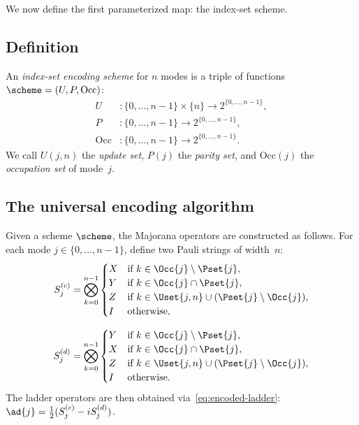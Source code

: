 
We now define the first parameterized map: the index-set scheme.

\subsection{Definition}

\begin{definition}
\label{def:index-set-scheme}
An \emph{index-set encoding scheme} for $n$ modes is a triple of
functions $\scheme = (U, P, \mathrm{Occ})$:
\begin{align}
  U &: \{0, \ldots, n{-}1\} \times \{n\} \to 2^{\{0,\ldots,n{-}1\}},
    \label{eq:update-fn} \\
  P &: \{0, \ldots, n{-}1\} \to 2^{\{0,\ldots,n{-}1\}},
    \label{eq:parity-fn} \\
  \mathrm{Occ} &: \{0, \ldots, n{-}1\} \to 2^{\{0,\ldots,n{-}1\}}.
    \label{eq:occ-fn}
\end{align}
We call $U(j,n)$ the \emph{update set}, $P(j)$ the \emph{parity set},
and $\mathrm{Occ}(j)$ the \emph{occupation set} of mode~$j$.
\end{definition}

\subsection{The universal encoding algorithm}
\label{sec:universal-algorithm}

Given a scheme $\scheme$, the Majorana operators are constructed as
follows.  For each mode $j \in \{0, \ldots, n{-}1\}$, define two
Pauli strings of width~$n$:
\begin{align}
  S_j^{(c)} &= \bigotimes_{k=0}^{n-1}
    \begin{cases}
      X & \text{if } k \in \Occ{j} \setminus \Pset{j}, \\
      Y & \text{if } k \in \Occ{j} \cap \Pset{j}, \\
      Z & \text{if } k \in \Uset{j,n} \cup
          (\Pset{j} \setminus \Occ{j}), \\
      I & \text{otherwise},
    \end{cases}
    \label{eq:cj-from-scheme} \\[6pt]
  S_j^{(d)} &= \bigotimes_{k=0}^{n-1}
    \begin{cases}
      Y & \text{if } k \in \Occ{j} \setminus \Pset{j}, \\
      X & \text{if } k \in \Occ{j} \cap \Pset{j}, \\
      Z & \text{if } k \in \Uset{j,n} \cup
          (\Pset{j} \setminus \Occ{j}), \\
      I & \text{otherwise}.
    \end{cases}
    \label{eq:dj-from-scheme}
\end{align}
The ladder operators are then obtained
via~\eqref{eq:encoded-ladder}:
$\ad{j} = \tfrac{1}{2}(S_j^{(c)} - i S_j^{(d)})$.

